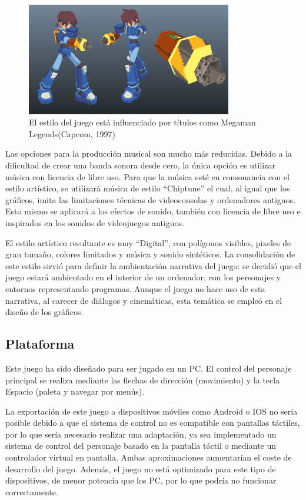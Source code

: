 \begin{figure}[h]
	\includegraphics[width=0.8\textwidth]{images/intro/design/megaman}
	\centering
	\caption{El estilo del juego está influenciado por títulos como Megaman Legends(Capcom, 1997)}
\end{figure}

Las opciones para la producción musical son mucho más reducidas. Debido a la dificultad de crear una banda sonora desde cero, la única opción es utilizar música con licencia de libre uso. Para que la música esté en consonancia con el estilo artístico, se utilizará música de estilo ``Chiptune'' el cual, al igual que los gráficos, imita las limitaciones técnicas de videoconsolas y ordenadores antiguos. Esto mismo se aplicará a los efectos de sonido, también con licencia de libre uso e inspirados en los sonidos de videojuegos antiguos.

El estilo artístico resultante es muy ``Digital'', con polígonos visibles, pixeles de gran tamaño, colores limitados y música y sonido sintéticos. La consolidación de este estilo sirvió para definir la ambientación narrativa del juego: se decidió que el juego estará ambientado en el interior de un ordenador, con los personajes y entornos representando programas. Aunque el juego no hace uso de esta narrativa, al carecer de diálogos y cinemáticas, esta temática se empleó en el diseño de los gráficos.

\subsection{Plataforma}
Este juego ha sido diseñado para ser jugado en un PC. El control del personaje principal se realiza mediante las flechas de dirección (movimiento) y la tecla Espacio (paleta y navegar por menús). 

La exportación de este juego a dispositivos móviles como Android o IOS no sería posible debido a que el sistema de control no es compatible con pantallas táctiles, por lo que sería necesario realizar una adaptación, ya sea implementado un sistema de control del personaje basado en la pantalla táctil o mediante un controlador virtual en pantalla. Ambas aproximaciones aumentarían el coste de desarrollo del juego. Además, el juego no está optimizado para este tipo de dispositivos, de menor potencia que los PC, por lo que podría no funcionar correctamente.

